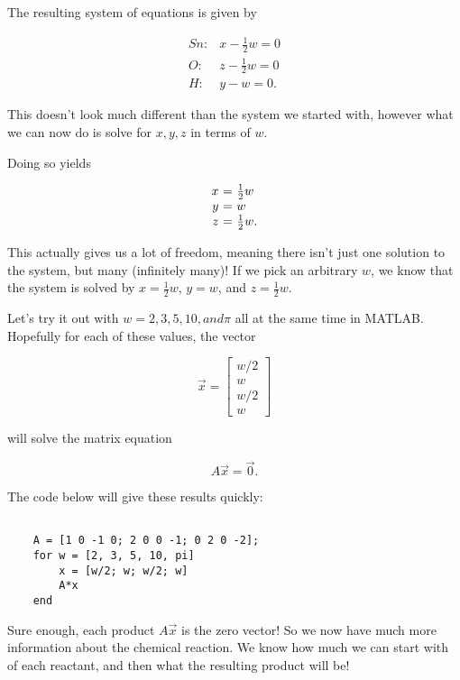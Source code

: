 \documentclass{ximera}
\begin{document}
\begin{exploration}
\begin{example}
The resulting system of equations is given by

\begin{equation*}
  \begin{array}{cl}
    Sn: & x - \frac{1}{2}w = 0 \\
    O: & z - \frac{1}{2}w = 0 \\
    H: & y - w = 0.
  \end{array}
\end{equation*}

This doesn't look much different than the system we started with, however what we can now do is solve for $x,y,z$ in terms of $w$. 

Doing so yields

\begin{equation*}
  \begin{array}{r@{~}c@{~}l}
    x &=& \frac{1}{2}w \\
    y &=& w \\
    z &=& \frac{1}{2}w.
  \end{array}
\end{equation*}

This actually gives us a lot of freedom, meaning there isn't just one solution to the system, but many (infinitely many)! If we pick an arbitrary $w$, we know that the system is solved by $x=\frac{1}{2}w$, $y=w$, and $z=\frac{1}{2}w$.

Let's try it out with $w=2, 3, 5, 10, and \pi$ all at the same time in MATLAB. Hopefully for each of these values, the vector 

$$\vec{x}=\begin{bmatrix} w/2 \\ w \\ w/2 \\ w \end{bmatrix}$$

will solve the matrix equation

$$A\vec{x}=\vec{0}.$$

The code below will give these results quickly:

\begin{verbatim}

    A = [1 0 -1 0; 2 0 0 -1; 0 2 0 -2];
    for w = [2, 3, 5, 10, pi]
        x = [w/2; w; w/2; w]
        A*x
    end

\end{verbatim}

Sure enough, each product $A\vec{x}$ is the zero vector! So we now have much more information about the chemical reaction. We know how much we can start with of each reactant, and then what the resulting product will be!


\end{example}
\end{exploration}
\end{document}
